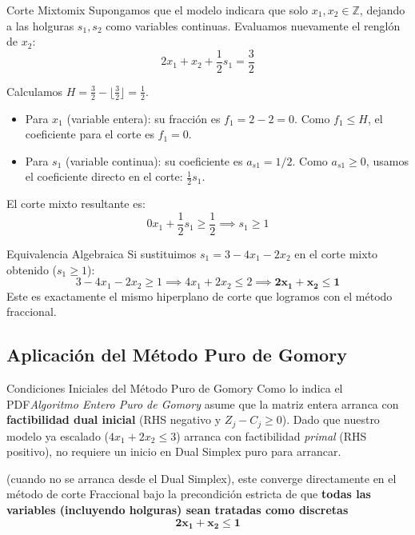 \documentclass[10pt,a4paper]{article}
\begin{document}
\begin{mytheo}{Corte Mixto}{mix}
Supongamos que el modelo indicara que solo $x_1, x_2 \in \mathbb{Z}$, dejando a las holguras $s_1, s_2$ como variables continuas. Evaluamos nuevamente el renglón de $x_2$:
\[ 2x_1 + x_2 + \frac{1}{2}s_1 = \frac{3}{2} \]

Calculamos $H = \frac{3}{2} - \lfloor \frac{3}{2} \rfloor = \frac{1}{2}$.
\begin{itemize}
    \item Para $x_1$ (variable entera): su fracción es $f_1 = 2 - 2 = 0$. Como $f_1 \leq H$, el coeficiente para el corte es $f_1 = 0$.
    \item Para $s_1$ (variable continua): su coeficiente es $a_{s1} = 1/2$. Como $a_{s1} \geq 0$, usamos el coeficiente directo en el corte: $\frac{1}{2}s_1$.
\end{itemize}
El corte mixto resultante es:
\[ 0 x_1 + \frac{1}{2}s_1 \geq \frac{1}{2} \implies s_1 \geq 1 \]
\end{mytheo}

\begin{nota}{Equivalencia Algebraica}
Si sustituimos $s_1 = 3 - 4x_1 - 2x_2$ en el corte mixto obtenido ($s_1 \geq 1$):
\[ 3 - 4x_1 - 2x_2 \geq 1 \implies 4x_1 + 2x_2 \leq 2 \implies \mathbf{2x_1 + x_2 \leq 1} \]
Este es exactamente el mismo hiperplano de corte que logramos con el método fraccional.
\end{nota}


\subsection{Aplicación del Método Puro de Gomory}

\begin{alerta}{Condiciones Iniciales del Método Puro de Gomory}
Como lo indica el PDF\textit{Algoritmo Entero Puro de Gomory} asume que la matriz entera arranca con \textbf{factibilidad dual inicial} (RHS negativo y $Z_j - C_j \geq 0$). 
Dado que nuestro modelo ya escalado ($4x_1 + 2x_2 \leq 3$) arranca con factibilidad \textit{primal} (RHS positivo), no requiere un inicio en Dual Simplex puro para arrancar. 

(cuando no se arranca desde el Dual Simplex), este converge directamente en el 
método de corte Fraccional bajo la precondición estricta de que 
\textbf{todas las variables (incluyendo holguras) 
sean tratadas como discretas}
\[ \mathbf{2x_1 + x_2 \leq 1} \]
\end{alerta}
\end{document}
